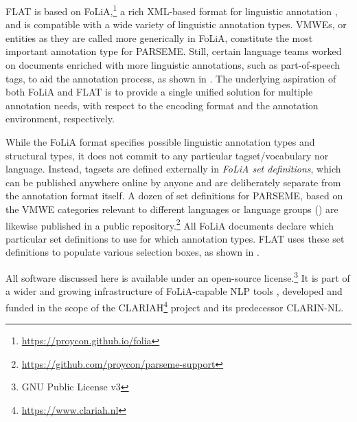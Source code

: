 \documentclass[output=paper,modfonts]{langscibook}
\begin{document}
FLAT is based on FoLiA,\footnote{\scriptsize\url{https://proycon.github.io/folia}} a rich XML-based format for linguistic annotation
\citep{GompelReynaert13}, and is compatible with a wide variety of linguistic annotation types. 
VMWEs, or entities as they are called more generically in FoLiA, constitute the most important
annotation type for PARSEME. Still, certain language teams worked on documents enriched with more linguistic
annotations, such as part-of-speech tags, to aid the annotation process, as shown in . The underlying aspiration of both FoLiA and
FLAT is to provide a single unified solution for multiple annotation needs, with respect to the encoding format and the 
annotation environment, respectively.



While the FoLiA format %
specifies possible linguistic annotation types and structural types, 
it does not commit to any particular tagset/vocabulary nor language. %
Instead, tagsets are
defined externally in \emph{FoLiA set definitions}, which can be published anywhere online by
anyone and are deliberately separate from the annotation format itself. A dozen of set definitions for PARSEME, based on the VMWE categories relevant to different languages or language groups () are likewise published in a public repository.\footnote{\scriptsize{\url{https://github.com/proycon/parseme-support}}} All FoLiA documents declare which particular set definitions to use for which annotation
types. FLAT uses these set definitions to populate various selection boxes,  %
as shown in .


All software discussed here %
is %
available under an open-source license.\footnote{\scriptsize{GNU Public License v3}} It is %
part of a wider and growing infrastructure of FoLiA-capable NLP tools \citep{Gompel_etal:17}, developed and funded in the scope of the %
CLARIAH\footnote{\scriptsize{\url{https://www.clariah.nl}}} project and its predecessor CLARIN-NL.
\end{document}

